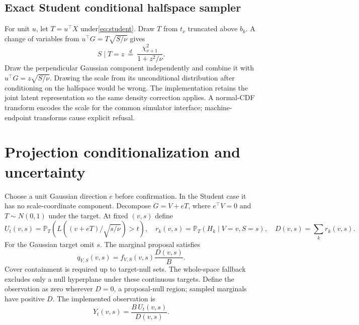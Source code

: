 \documentclass[11pt]{article}
\newcommand{\Pp}{\mathbb P}
\begin{document}
\subsection{Exact Student conditional halfspace sampler}
For unit $ u $, let $ T=u^\top X $ under\eqref{eq:student}. Draw $ T $ from $ t_\nu $ truncated above $ b_k $. A change of variables from $ u^\top G=T\sqrt{S/\nu}$ gives
\begin{equation}
 S\mid T=z\ \overset d=\ \frac{\chi^2_{\nu+1}}{1+z^2/\nu}.
 \label{eq:gamma}
\end{equation}
Draw the perpendicular Gaussian component independently and combine it with $ u^\top G=z\sqrt{S/\nu}$. Drawing the scale from its unconditional distribution after conditioning on the halfspace would be wrong. The implementation retains the joint latent representation so the same density correction applies. A normal-CDF transform encodes the scale for the common simulator interface; machine-endpoint transforms cause explicit refusal.

\section{Projection conditionalization and uncertainty}
Choose a unit Gaussian direction $ e $ before confirmation. In the Student case it has no scale-coordinate component. Decompose $ G=V+eT $, where $ e^\top V=0 $ and $ T\sim N(0,1)$ under the target. At fixed $(v,s)$ define
\begin{equation}
 U_t(v,s)=\Pp_T(L((v+eT)/\sqrt{s/\nu})>t),\quad
 r_k(v,s)=\Pp_T(H_k\mid V=v,S=s),\quad D(v,s)=\sum_kr_k(v,s).
\end{equation}
For the Gaussian target omit $ s $. The marginal proposal satisfies
\begin{equation}
 q_{V,S}(v,s)=f_{V,S}(v,s)\frac{D(v,s)}B.
\end{equation}
Cover containment is required up to target-null sets. The whole-space fallback excludes only a null hyperplane under these continuous targets. Define the observation as zero wherever $ D=0 $, a proposal-null region; sampled marginals have positive $ D $. The implemented observation is
\begin{equation}
 Y_t(v,s)=\frac{B\,U_t(v,s)}{D(v,s)}.
 \label{eq:projected}
\end{equation}
\end{document}
